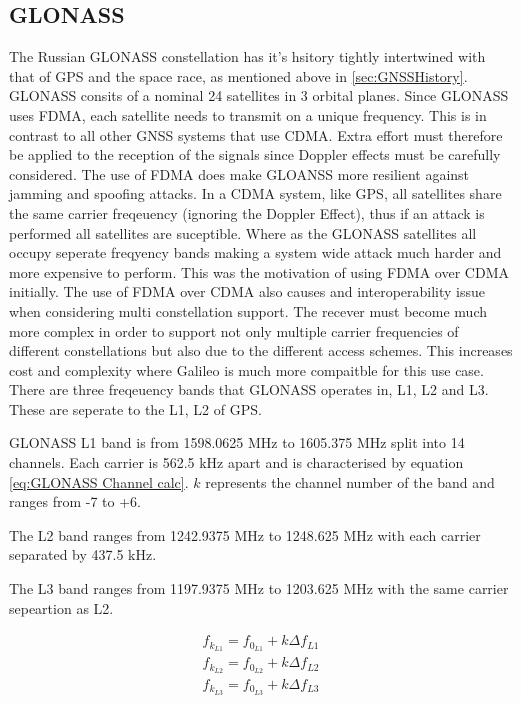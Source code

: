 \subsection{GLONASS} \label{subsec:GNSS_GLONASSIntro}
The Russian GLONASS constellation has it's hsitory tightly intertwined with that of GPS and the space race, as mentioned above in \ref{sec:GNSSHistory}.
GLONASS consits of a nominal 24 satellites in 3 orbital planes. Since GLONASS uses FDMA, each satellite needs to transmit on a unique frequency. This is in contrast to
all other GNSS systems that use CDMA. Extra effort must therefore be applied to the reception of the signals since Doppler effects must be carefully considered. 
The use of FDMA does make GLOANSS more resilient against jamming and spoofing attacks. In a CDMA system, like GPS, all satellites share the same carrier freqeuency
(ignoring the Doppler Effect), thus if an attack is performed all satellites are suceptible. Where as the GLONASS satellites all occupy seperate freqyency bands making a
system wide attack much harder and more expensive to perform. This was the motivation of using FDMA over CDMA initially. The use of FDMA over CDMA also causes and
interoperability issue when considering multi constellation support. The recever must become much more complex in order to support not only multiple carrier frequencies
of different constellations but also due to the different access schemes. This increases cost and complexity where Galileo is much more compaitble for this use case.
There are
three freqeuency bands that GLONASS operates in, L1, L2 and L3. These are seperate to the L1, L2 of GPS. 

GLONASS L1 band is from 1598.0625 MHz to 1605.375 MHz split into 14 channels. Each carrier is 562.5 kHz apart and is characterised by equation \ref{eq:GLONASS Channel
calc}. $k$ represents the channel number of the band and ranges from -7 to +6. 

The L2 band ranges from 1242.9375 MHz to 1248.625 MHz with each carrier separated by 437.5 kHz.

The L3 band ranges from 1197.9375 MHz to 1203.625 MHz with the same carrier sepeartion as L2.

\begin{equation} 
    \begin{split} \label{eq:GLONASS Channel calc}
        f_{k_{L1}} = f_{0_{L1}} + k \Delta f_{L1} \\ 
        f_{k_{L2}} = f_{0_{L2}} + k \Delta f_{L2} \\ 
        f_{k_{L3}} = f_{0_{L3}} + k \Delta f_{L3}
    \end{split}
\end{equation}

